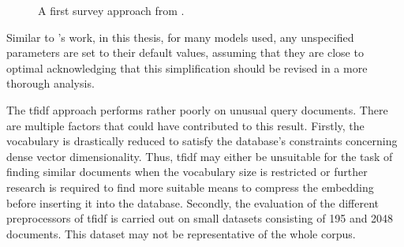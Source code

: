 \begin{figure}[!htp]%
    \centering
    \qquad
    \caption[Survey approach]{A first survey approach from \cite{BA-survey}.}%
    \label{fig:survey}%
\end{figure}

Similar to \citeauthor{glove2014}'s work, in this thesis, for many models used, any unspecified parameters are set to their default values, 
assuming that they are close to optimal
acknowledging that this simplification should be revised in a more thorough analysis.

The \ac{tfidf} approach performs rather poorly on unusual query documents.
There are multiple factors that could have contributed to this result.
Firstly, the vocabulary is drastically reduced to satisfy the database's constraints concerning dense vector dimensionality.
Thus, \ac{tfidf} may either be unsuitable for the task of finding similar documents when the vocabulary size is restricted or 
further research is required to find more suitable means to compress the embedding before inserting it into the database.
Secondly, the evaluation of the different preprocessors of \ac{tfidf} is carried out on small datasets consisting of 195 and 2048 documents.
This dataset may not be representative of the whole corpus.


